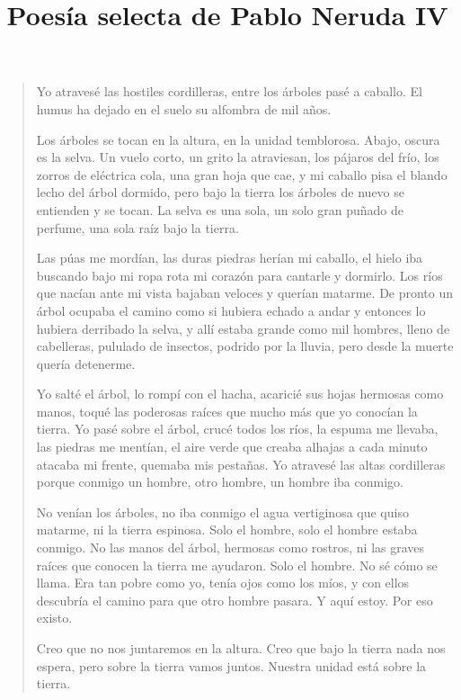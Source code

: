 \documentclass[12pt]{article}
\date{}
\title{Poesía selecta de Pablo Neruda IV}
\begin{document}
\maketitle
\tableofcontents

\clearpage
{}
\begin{verse}
Yo atravesé las hostiles  
cordilleras,  
entre los árboles pasé a caballo.  
El humus ha dejado  
en el suelo  
su alfombra de mil años.  

Los árboles se tocan en la altura,  
en la unidad temblorosa.  
Abajo, oscura es la selva.  
Un vuelo corto, un grito  
la atraviesan,  
los pájaros del frío,  
los zorros de eléctrica cola,  
una gran hoja que cae,  
y mi caballo pisa el blando  
lecho del árbol dormido,  
pero bajo la tierra  
los árboles de nuevo  
se entienden y se tocan.  
La selva es una sola,  
un solo gran puñado de perfume,  
una sola raíz bajo la tierra.  

Las púas me mordían,  
las duras piedras herían mi caballo,  
el hielo iba buscando bajo mi ropa rota  
mi corazón para cantarle y dormirlo.  
Los ríos que nacían  
ante mi vista bajaban veloces  
y querían matarme.  
De pronto un árbol ocupaba el camino  
como si hubiera  
echado a andar y entonces  
lo hubiera derribado  
la selva, y allí estaba  
grande como mil hombres,  
lleno de cabelleras,  
pululado de insectos,  
podrido por la lluvia,  
pero desde la muerte  
quería detenerme.  

Yo salté el árbol,  
lo rompí con el hacha,  
acaricié sus hojas hermosas como manos,  
toqué las poderosas  
raíces que mucho más que yo  
conocían la tierra.  
Yo pasé sobre el árbol,  
crucé todos los ríos,  
la espuma me llevaba,  
las piedras me mentían,  
el aire verde que creaba  
alhajas a cada minuto  
atacaba mi frente,  
quemaba mis pestañas.  
Yo atravesé las altas cordilleras  
porque conmigo un hombre,  
otro hombre, un hombre  
iba conmigo.  

No venían los árboles,  
no iba conmigo el agua  
vertiginosa que quiso matarme,  
ni la tierra espinosa.  
Solo el hombre,  
solo el hombre estaba conmigo.  
No las manos del árbol,  
hermosas como rostros, ni las graves  
raíces que conocen la tierra  
me ayudaron.  
Solo el hombre.  
No sé cómo se llama.  
Era tan pobre como yo, tenía  
ojos como los míos, y con ellos  
descubría el camino  
para que otro hombre pasara.  
Y aquí estoy.  
Por eso existo.  

Creo  
que no nos juntaremos en la altura.  
Creo  
que bajo la tierra nada nos espera,  
pero sobre la tierra  
vamos juntos.  
Nuestra unidad está sobre la tierra.  

\end{verse}
\end{document}
